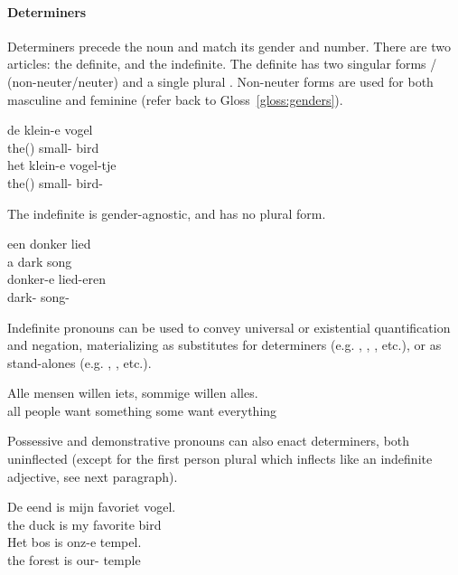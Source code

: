 \paragraph{Determiners}
Determiners precede the noun and match its gender and number.
There are two articles: the definite, and the indefinite.
The definite has two singular forms / (non-neuter/neuter) and a single plural . 
Non-neuter forms are used for both masculine and feminine (refer back to Gloss~\ref{gloss:genders}).
\begin{exe}
\ex\label{gloss:gender_change}
\begin{xlist}
\ex
\gll de klein-e vogel\\
the() small- bird\\
\ex
\gll het klein-e vogel-tje\\
the() small- bird-\\
\end{xlist}
\end{exe}
The indefinite  is gender-agnostic, and has no plural form.
\begin{exe}
\ex
\begin{xlist}
\ex\label{gloss:indef_adj_sg_n}
\gll een donker lied\\
a dark song\\
\ex 
\gll donker-e lied-eren\\
dark- song-\\
\end{xlist}
\end{exe}
Indefinite pronouns can be used to convey universal or existential quantification and negation, materializing as substitutes for determiners (e.g. , , , etc.), or as stand-alones (e.g. , , etc.).
\begin{exe}
\ex
\gll Alle mensen willen iets, sommige willen alles.\\
all people want something some want everything\\
\end{exe}
Possessive and demonstrative pronouns can also enact determiners, both uninflected (except for the first person plural  which inflects like an indefinite adjective, see next paragraph).
\begin{exe}
\ex
\gll De eend is mijn favoriet vogel.\\
the duck is my favorite bird\\
\ex\label{gloss:ido}
\gll Het bos is onz-e tempel.\\
the forest is our- temple\\
\end{exe}
